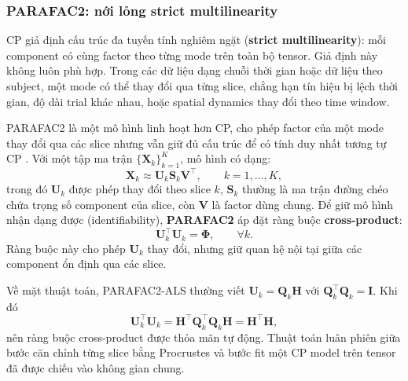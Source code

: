 \subsubsection{PARAFAC2: nới lỏng strict multilinearity}
\label{sec:dm-parafac2}

CP giả định cấu trúc đa tuyến tính nghiêm ngặt (\textbf{strict multilinearity}): mỗi component có cùng factor theo từng mode trên toàn bộ tensor. Giả định này không luôn phù hợp. Trong các dữ liệu dạng chuỗi thời gian hoặc dữ liệu theo subject, một mode có thể thay đổi qua từng slice, chẳng hạn tín hiệu bị lệch thời gian, độ dài trial khác nhau, hoặc spatial dynamics thay đổi theo time window.

PARAFAC2 là một mô hình linh hoạt hơn CP, cho phép factor của một mode thay đổi qua các slice nhưng vẫn giữ đủ cấu trúc để có tính duy nhất tương tự CP \cite{chrysos2025foundationsTutorial}. Với một tập ma trận $\{\mathbf{X}_k\}_{k=1}^{K}$, mô hình có dạng:
\begin{equation}
    \mathbf{X}_k
    \approx
    \mathbf{U}_k \mathbf{S}_k \mathbf{V}^{\top},
    \qquad k = 1,\ldots,K,
    \label{eq:dm-parafac2}
\end{equation}
trong đó $\mathbf{U}_k$ được phép thay đổi theo slice $k$, $\mathbf{S}_k$ thường là ma trận đường chéo chứa trọng số component của slice, còn $\mathbf{V}$ là factor dùng chung. Để giữ mô hình nhận dạng được (identifiability), \textbf{PARAFAC2} áp đặt ràng buộc \textbf{cross-product}:
\begin{equation}
    \mathbf{U}_k^\top \mathbf{U}_k = \boldsymbol{\Phi},
    \qquad \forall k.
    \label{eq:dm-parafac2-constraint}
\end{equation}
Ràng buộc này cho phép $\mathbf{U}_k$ thay đổi, nhưng giữ quan hệ nội tại giữa các component ổn định qua các slice.

Về mặt thuật toán, PARAFAC2-ALS thường viết $\mathbf{U}_k=\mathbf{Q}_k\mathbf{H}$ với $\mathbf{Q}_k^\top\mathbf{Q}_k=\mathbf{I}$. Khi đó
\begin{equation}
    \mathbf{U}_k^\top\mathbf{U}_k
    =
    \mathbf{H}^\top\mathbf{Q}_k^\top\mathbf{Q}_k\mathbf{H}
    =
    \mathbf{H}^\top\mathbf{H},
    \label{eq:dm-parafac2-param}
\end{equation}
nên ràng buộc cross-product được thỏa mãn tự động. Thuật toán luân phiên giữa bước căn chỉnh từng slice bằng Procrustes và bước fit một CP model trên tensor đã được chiếu vào không gian chung.

